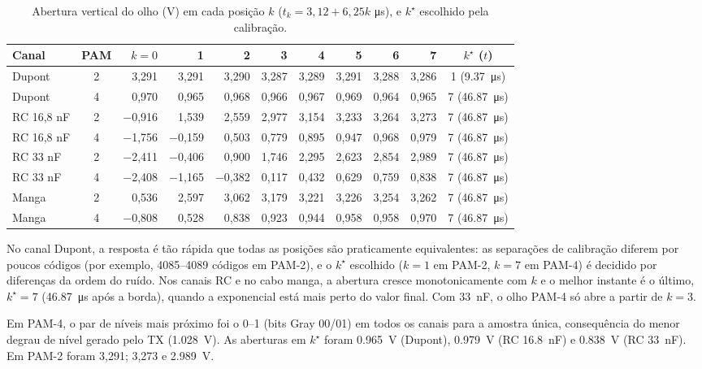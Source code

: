 \documentclass[12pt,a4paper]{article}
\begin{document}
\begin{table}[H]
\centering
\caption{Abertura vertical do olho (V) em cada posição $k$ ($t_k = 3{,}12+6{,}25k$ \si{\micro\second}),
e $k^\star$ escolhido pela calibração.}
\label{tab:olho}
\footnotesize
\setlength{\tabcolsep}{4pt}
\begin{tabular}{l c r r r r r r r r c}
\toprule
Canal & PAM & $k=0$ & 1 & 2 & 3 & 4 & 5 & 6 & 7 & $k^\star$ ($t$) \\
\midrule
Dupont & 2 & 3,291 & 3,291 & 3,290 & 3,287 & 3,289 & 3,291 & 3,288 & 3,286 & 1 (\SI{9,37}{\micro\second}) \\
Dupont & 4 & 0,970 & 0,965 & 0,968 & 0,966 & 0,967 & 0,969 & 0,964 & 0,965 & 7 (\SI{46,87}{\micro\second}) \\
RC 16,8 nF & 2 & $-$0,916 & 1,539 & 2,559 & 2,977 & 3,154 & 3,233 & 3,264 & 3,273 & 7 (\SI{46,87}{\micro\second}) \\
RC 16,8 nF & 4 & $-$1,756 & $-$0,159 & 0,503 & 0,779 & 0,895 & 0,947 & 0,968 & 0,979 & 7 (\SI{46,87}{\micro\second}) \\
RC 33 nF & 2 & $-$2,411 & $-$0,406 & 0,900 & 1,746 & 2,295 & 2,623 & 2,854 & 2,989 & 7 (\SI{46,87}{\micro\second}) \\
RC 33 nF & 4 & $-$2,408 & $-$1,165 & $-$0,382 & 0,117 & 0,432 & 0,629 & 0,759 & 0,838 & 7 (\SI{46,87}{\micro\second}) \\
Manga & 2 & 0,536 & 2,597 & 3,062 & 3,179 & 3,221 & 3,226 & 3,254 & 3,262 & 7 (\SI{46,87}{\micro\second}) \\
Manga & 4 & $-$0,808 & 0,528 & 0,838 & 0,923 & 0,944 & 0,958 & 0,958 & 0,970 & 7 (\SI{46,87}{\micro\second}) \\
\bottomrule
\end{tabular}
\end{table}

No canal Dupont, a resposta é tão rápida que todas as posições são praticamente equivalentes: as
separações de calibração diferem por poucos códigos (por exemplo, \numrange{4085}{4089} códigos em
PAM-2), e o $k^\star$ escolhido ($k=1$ em PAM-2, $k=7$ em PAM-4) é decidido por diferenças da ordem do
ruído. Nos canais RC e no cabo manga, a abertura cresce monotonicamente com $k$ e o melhor instante é
o último, $k^\star = 7$ (\SI{46,87}{\micro\second} após a borda), quando a exponencial está mais perto
do valor final. Com \SI{33}{nF}, o olho PAM-4 só abre a partir de $k=3$.

Em PAM-4, o par de níveis mais próximo foi o 0--1 (bits Gray 00/01) em todos os canais para a
amostra única, consequência do menor degrau de nível gerado pelo TX (\SI{1,028}{V}). As aberturas
em $k^\star$ foram \SI{0,965}{V} (Dupont), \SI{0,979}{V} (RC \SI{16,8}{nF}) e \SI{0,838}{V}
(RC \SI{33}{nF}). Em PAM-2 foram 3,291; 3,273 e \SI{2,989}{V}.
\end{document}

